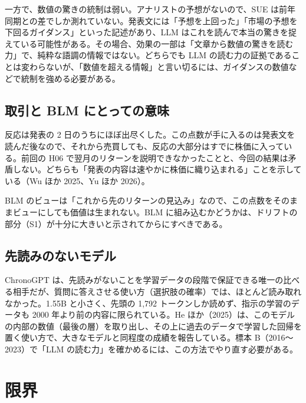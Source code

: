 \documentclass[xelatex,ja=standard,jafont=haranoaji,a4paper,10pt,openany]{bxjsreport}
\begin{document}
一方で、数値の驚きの統制は弱い。アナリストの予想がないので、SUE は前年同期との差でしか測れていない。発表文には「予想を上回った」「市場の予想を下回るガイダンス」といった記述があり、LLM はこれを読んで本当の驚きを捉えている可能性がある。その場合、効果の一部は「文章から数値の驚きを読む力」で、純粋な語調の情報ではない。どちらでも LLM の読む力の証拠であることは変わらないが、「数値を超える情報」と言い切るには、ガイダンスの数値などで統制を強める必要がある。

\section{取引と BLM にとっての意味}

反応は発表の 2 日のうちにほぼ出尽くした。この点数が手に入るのは発表文を読んだ後なので、それから売買しても、反応の大部分はすでに株価に入っている。前回の H06 で翌月のリターンを説明できなかったことと、今回の結果は矛盾しない。どちらも「発表の内容は速やかに株価に織り込まれる」ことを示している（Wu ほか 2025、Yu ほか 2026）。

BLM のビューは「これから先のリターンの見込み」なので、この点数をそのままビューにしても価値は生まれない。BLM に組み込むかどうかは、ドリフトの部分（S1）が十分に大きいと示されてからにすべきである。

\section{先読みのないモデル}

ChronoGPT は、先読みがないことを学習データの段階で保証できる唯一の比べる相手だが、質問に答えさせる使い方（選択肢の確率）では、ほとんど読み取れなかった。1.55B と小さく、先頭の 1,792 トークンしか読めず、指示の学習のデータも 2000 年より前の内容に限られている。He ほか（2025）は、このモデルの内部の数値（最後の層）を取り出し、その上に過去のデータで学習した回帰を置く使い方で、大きなモデルと同程度の成績を報告している。標本 B（2016〜2023）で「LLM の読む力」を確かめるには、この方法でやり直す必要がある。

\chapter{限界}\label{ch:limits}
\end{document}
